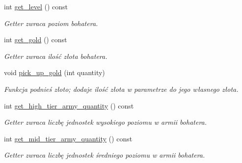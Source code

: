 \begin{DoxyCompactItemize}
int \hyperlink{classmodel_1_1Hero_a02d55a332f0355fa1a87c65ea87691ff}{get\+\_\+level} () const
\begin{DoxyCompactList}\small\item\em Getter zwraca poziom bohatera. \end{DoxyCompactList}\item 
\mbox{\label{classmodel_1_1Hero_a90e159c929f4c0b5372cdcdc43bda737}} 
int \hyperlink{classmodel_1_1Hero_a90e159c929f4c0b5372cdcdc43bda737}{get\+\_\+gold} () const
\begin{DoxyCompactList}\small\item\em Getter zwraca ilość złota bohatera. \end{DoxyCompactList}\item 
\mbox{\label{classmodel_1_1Hero_a40675022d006773874a54cc70b0ff84a}} 
void \hyperlink{classmodel_1_1Hero_a40675022d006773874a54cc70b0ff84a}{pick\+\_\+up\+\_\+gold} (int quantity)
\begin{DoxyCompactList}\small\item\em Funkcja podnieś złoto; dodaje ilość złota w parametrze do jego własnego złota. \end{DoxyCompactList}\item 
\mbox{\label{classmodel_1_1Hero_a1d0c79ec3789a82172a0d2dd1aa0488a}} 
int \hyperlink{classmodel_1_1Hero_a1d0c79ec3789a82172a0d2dd1aa0488a}{get\+\_\+high\+\_\+tier\+\_\+army\+\_\+quantity} () const
\begin{DoxyCompactList}\small\item\em Getter zwraca liczbę jednostek wysokiego poziomu w armii bohatera. \end{DoxyCompactList}\item 
\mbox{\label{classmodel_1_1Hero_a8828fd7c3ed0b8c1a94ef62022cdce56}} 
int \hyperlink{classmodel_1_1Hero_a8828fd7c3ed0b8c1a94ef62022cdce56}{get\+\_\+mid\+\_\+tier\+\_\+army\+\_\+quantity} () const
\begin{DoxyCompactList}\small\item\em Getter zwraca liczbę jednostek średniego poziomu w armii bohatera. \end{DoxyCompactList}\item 
\mbox{\label{classmodel_1_1Hero_a39aec53f854130463e7346d29e81f568}} 

\end{DoxyCompactItemize}
